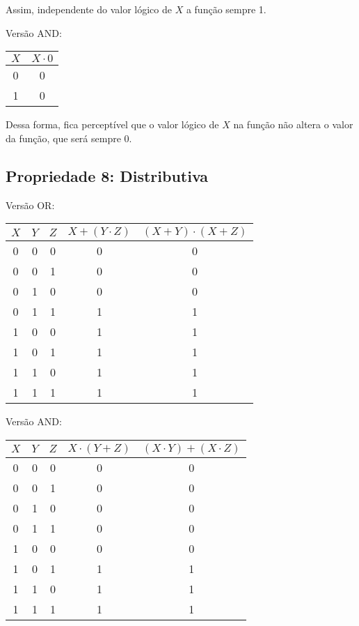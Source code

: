 \documentclass[12pt]{article}
\begin{document}
Assim, independente do valor lógico de $X$ a função sempre 1.

Versão AND: 
\begin{center}
\begin{tabular}{|c|c|}
\hline
$X$  & $X \cdot 0$ \\
\hline
0 & 0 \\
1 & 0 \\
\hline
\end{tabular}
\end{center}

Dessa forma, fica perceptível que o valor lógico de $X$ na função não altera o valor da função, que será sempre 0.

\subsection{Propriedade 8: Distributiva}

Versão OR:
\begin{center}
\begin{tabular}{|c|c|c|c|c|}
\hline
$X$  & $Y$ & $Z$ & $X + (Y \cdot Z)$ & $(X + Y) \cdot (X + Z)$ \\
\hline
0 & 0 & 0 & 0 & 0 \\
0 & 0 & 1 & 0 & 0 \\
0 & 1 & 0 & 0 & 0 \\
0 & 1 & 1 & 1 & 1 \\
1 & 0 & 0 & 1 & 1 \\
1 & 0 & 1 & 1 & 1 \\
1 & 1 & 0 & 1 & 1 \\
1 & 1 & 1 & 1 & 1 \\
\hline 
\end{tabular}
\end{center}


Versão AND:
\begin{center}
\begin{tabular}{|c|c|c|c|c|}
\hline
$X$  & $Y$ & $Z$ & $X \cdot (Y + Z)$ & $(X \cdot Y) + (X \cdot Z)$ \\
\hline
0 & 0 & 0 & 0 & 0 \\
0 & 0 & 1 & 0 & 0 \\
0 & 1 & 0 & 0 & 0 \\
0 & 1 & 1 & 0 & 0 \\
1 & 0 & 0 & 0 & 0 \\
1 & 0 & 1 & 1 & 1 \\
1 & 1 & 0 & 1 & 1 \\
1 & 1 & 1 & 1 & 1 \\
\hline
\end{tabular}
\end{center}
\end{document}
